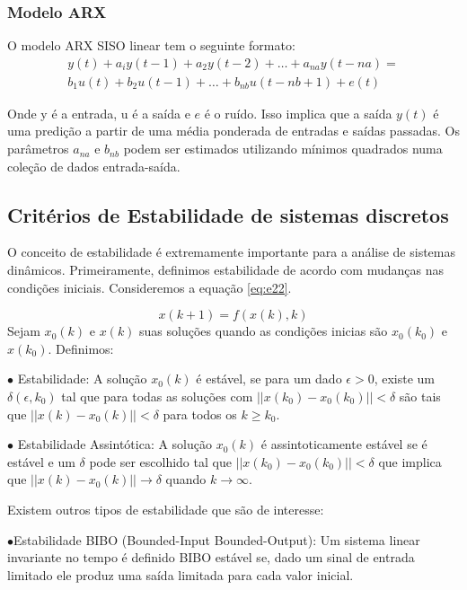 \subsubsection{Modelo ARX}
O modelo ARX SISO linear tem o seguinte formato:
\begin{equation}\label{eq:ARXModel}
\begin{aligned}
y(t)+a_iy(t-1)+a_2y(t-2)+\dots+a_{na}y(t-na)=\\
b_1u(t)+b_2u(t-1)+\dots+b_{nb}u(t-nb+1)+e(t)
\end{aligned}	
\end{equation}

Onde y é a entrada, u é a saída e $e$ é o ruído. Isso implica que a saída $y(t)$ é uma predição a partir de uma média ponderada de entradas e saídas passadas. Os parâmetros $a_{na}$ e $b_{nb}$ podem ser estimados utilizando mínimos quadrados numa coleção de dados entrada-saída.

\subsection{Critérios de Estabilidade de sistemas discretos}

O conceito de estabilidade é extremamente importante para a análise de sistemas dinâmicos. Primeiramente, definimos  estabilidade de acordo com mudanças nas condições iniciais. Consideremos a equação \eqref{eq:e22}.

\begin{equation} \label{eq:e22}
x(k+1)=f(x(k),k)
\end{equation}
Sejam $x_0(k)$ e $x(k)$ suas soluções quando as condições inicias são $x_0(k_0)$ e $x(k_0)$. Definimos:


$\bullet$ Estabilidade: A solução $x_0(k)$ é estável, se para um dado $\epsilon>0$, existe um $\delta(\epsilon,k_0)$ tal que para todas as soluções com $||x(k_0)-x_0(k_0)||<\delta$ são tais que $||x(k)-x_0(k)||<\delta$ para todos os $k \geqslant k_0$.


$\bullet$ Estabilidade Assintótica: A solução $x_0(k)$ é assintoticamente estável se é estável e um $\delta$ pode ser escolhido tal que  $||x(k_0)-x_0(k_0)||<\delta$ que implica que $||x(k)-x_0(k)||\to\delta$ quando $k \to \infty$.


Existem outros tipos de estabilidade que são de interesse:


$\bullet$Estabilidade BIBO (Bounded-Input Bounded-Output): Um sistema linear invariante no tempo é definido BIBO estável se, dado um sinal de entrada limitado ele produz uma saída limitada para cada valor inicial.


